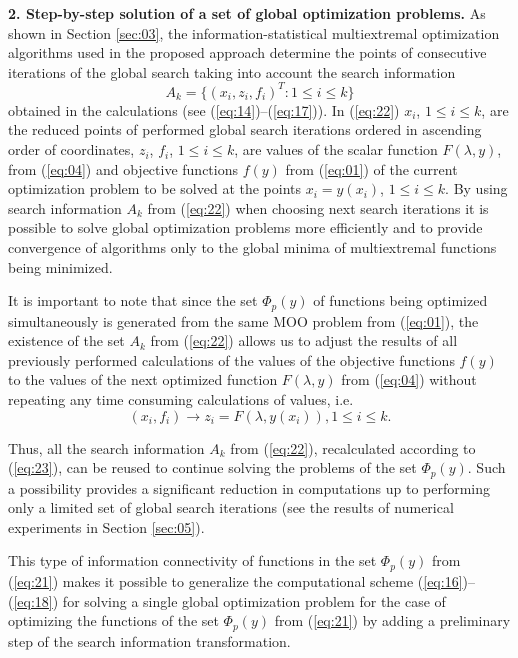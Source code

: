 \documentclass[runningheads]{llncs}
\begin{document}
\textbf{2. Step-by-step solution of a set of global optimization problems.} As shown in Section \ref{sec:03}, the information-statistical multiextremal optimization algorithms used in the proposed approach determine the points of consecutive iterations of the global search taking into account the search information
\begin{equation}
\label{eq:22}
A_k=\{(x_i,z_i,f_i )^T:1 \leq i \leq k\}
\end{equation}
obtained in the calculations (see (\ref{eq:14})--(\ref{eq:17})). In (\ref{eq:22}) $x_i$, $1 \leq i \leq k$,  are the reduced points of performed global search iterations ordered in ascending order of coordinates,  $z_i$, $f_i$, $1 \leq i \leq k$, are values of the scalar function $F(\lambda, y)$, from (\ref{eq:04}) and objective functions $f(y)$ from (\ref{eq:01}) of the current optimization problem to be solved at the points $x_i=y(x_i)$, $1 \leq i \leq k$. By using search information $A_k$ from (\ref{eq:22}) when choosing next search iterations it is possible to solve global optimization problems more efficiently and to provide convergence of algorithms only to the global minima of multiextremal functions being minimized.

It is important to note that since the set $\Phi_p(y)$ of functions being optimized  simultaneously is generated from the same MOO problem from (\ref{eq:01}), the existence of the set $A_k$ from (\ref{eq:22}) allows us to adjust the results of all previously performed calculations of the values of the objective functions $f(y)$ to the values of the next optimized function $F(\lambda, y)$ from (\ref{eq:04}) without repeating any time consuming calculations of values, i.e.
\begin{equation}
\label{eq:23}
(x_i,f_i ) \to z_i=F(\lambda, y(x_i)) ,1 \leq i \leq k.
\end{equation}

Thus, all the search information $A_k$ from (\ref{eq:22}), recalculated according to (\ref{eq:23}), can be reused to continue solving the problems of the set $\Phi_p(y)$. Such a possibility provides a significant reduction in computations up to performing only a limited set of global search iterations (see the results of numerical experiments in Section \ref{sec:05}).

     This type of information connectivity of functions in the set $\Phi_p(y)$ from (\ref{eq:21}) makes it possible to generalize the computational scheme (\ref{eq:16})--(\ref{eq:18}) for solving a single global optimization problem for the case of optimizing the functions of the set $\Phi_p(y)$ from (\ref{eq:21}) by adding a preliminary step of the search information  transformation.
\end{document}
